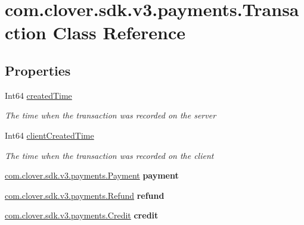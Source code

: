 \hypertarget{classcom_1_1clover_1_1sdk_1_1v3_1_1payments_1_1_transaction}{}\section{com.\+clover.\+sdk.\+v3.\+payments.\+Transaction Class Reference}
\label{classcom_1_1clover_1_1sdk_1_1v3_1_1payments_1_1_transaction}
\subsection*{Properties}
\begin{DoxyCompactItemize}
\item 
Int64 \hyperlink{classcom_1_1clover_1_1sdk_1_1v3_1_1payments_1_1_transaction_af6b65de96af4b8bc55484cdeab72186a}{created\+Time}
\begin{DoxyCompactList}\small\item\em The time when the transaction was recorded on the server \end{DoxyCompactList}\item 
Int64 \hyperlink{classcom_1_1clover_1_1sdk_1_1v3_1_1payments_1_1_transaction_a602c5a8c5bbbdc62370e8eb13b1a0f61}{client\+Created\+Time}
\begin{DoxyCompactList}\small\item\em The time when the transaction was recorded on the client \end{DoxyCompactList}\item 
\mbox{\label{classcom_1_1clover_1_1sdk_1_1v3_1_1payments_1_1_transaction_a833b26554048e1a542b928764b70f72b}} 
\hyperlink{classcom_1_1clover_1_1sdk_1_1v3_1_1payments_1_1_payment}{com.\+clover.\+sdk.\+v3.\+payments.\+Payment} {\bfseries payment}
\item 
\mbox{\label{classcom_1_1clover_1_1sdk_1_1v3_1_1payments_1_1_transaction_aec98ffc2c99453e6820ba9458ec5af07}} 
\hyperlink{classcom_1_1clover_1_1sdk_1_1v3_1_1payments_1_1_refund}{com.\+clover.\+sdk.\+v3.\+payments.\+Refund} {\bfseries refund}
\item 
\mbox{\label{classcom_1_1clover_1_1sdk_1_1v3_1_1payments_1_1_transaction_a9a5a25907281eec6692c67a85a9a1cea}} 
\hyperlink{classcom_1_1clover_1_1sdk_1_1v3_1_1payments_1_1_credit}{com.\+clover.\+sdk.\+v3.\+payments.\+Credit} {\bfseries credit}
\end{DoxyCompactItemize}


